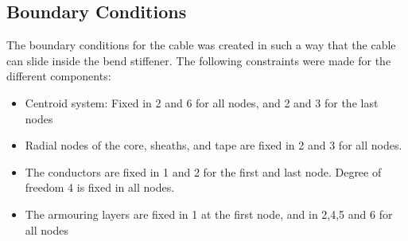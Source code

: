 \subsection{Boundary Conditions}
The boundary conditions for the cable was created in such a way that the cable can slide inside the bend stiffener. The following constraints were made for the different components:
\begin{itemize}
    \item Centroid system: Fixed in 2 and 6 for all nodes, and 2 and 3 for the last nodes
    \item Radial nodes of the core, sheaths, and tape are fixed in 2 and 3 for all nodes. 
    \item The conductors are fixed in 1 and 2 for the first and last node. Degree of freedom 4 is fixed in all nodes.
    \item The armouring layers are fixed in 1 at the first node, and in 2,4,5 and 6 for all nodes
\end{itemize}


